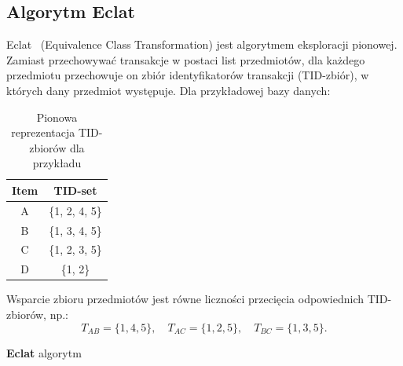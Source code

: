 \subsection{Algorytm Eclat}
Eclat~\cite{zaki2000scalable} (Equivalence Class Transformation) jest algorytmem eksploracji pionowej. Zamiast przechowywać transakcje w postaci list przedmiotów, dla każdego przedmiotu przechowuje on zbiór identyfikatorów transakcji (TID-zbiór), w których dany przedmiot występuje. Dla przykładowej bazy danych:


\begin{table}[ht]
\centering
\caption{Pionowa reprezentacja TID-zbiorów dla przykładu}
\label{tab:eclat_vertical}
\begin{tabularx}{.5\textwidth}{cC}
\toprule
Item & TID-set \\
\midrule
A & \{1, 2, 4, 5\} \\
B & \{1, 3, 4, 5\} \\
C & \{1, 2, 3, 5\} \\
D & \{1, 2\} \\
\bottomrule
\end{tabularx}
\end{table}

Wsparcie zbioru przedmiotów jest równe liczności przecięcia odpowiednich TID-zbiorów, np.:
\begin{equation}
T_{AB} = \{1,4,5\},\quad
T_{AC} = \{1,2,5\},\quad
T_{BC} = \{1,3,5\}.
\end{equation}


\begin{algorithm}[!htb]
\LinesNumbered
{}

\BlankLine


\caption{\textbf{Eclat} algorytm}
\label{alg:eclat}
\end{algorithm}


